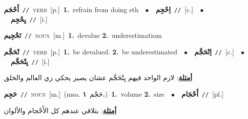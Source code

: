 \documentclass[10pt,a4paper,twoside]{article} %
\begin{document}
\begin{multicols}{2}
{\setlength\topsep{0pt}\textbf{\foreignlanguage{arabic}{أَحْجَم}}\ {\color{gray}\texttt{//}\color{black}}\ \textsc{verb}\ [p.]\ \textbf{1.}~refrain from doing sth\ \ $\bullet$\ \ \setlength\topsep{0pt}\textbf{\foreignlanguage{arabic}{اِحْجِم}}\ {\color{gray}\texttt{//}\color{black}}\ [c.]\ \ $\bullet$\ \ \setlength\topsep{0pt}\textbf{\foreignlanguage{arabic}{يِحْجِم}}\ {\color{gray}\texttt{//}\color{black}}\ [i.]\ } \vspace{2mm}

{\setlength\topsep{0pt}\textbf{\foreignlanguage{arabic}{تَحْجِيم}}\ {\color{gray}\texttt{//}\color{black}}\ \textsc{noun}\ [m.]\ \textbf{1.}~devalue  \textbf{2.}~underestimatiom\ } \vspace{2mm}

{\setlength\topsep{0pt}\textbf{\foreignlanguage{arabic}{تْحَجَّم}}\ {\color{gray}\texttt{//}\color{black}}\ \textsc{verb}\ [p.]\ \textbf{1.}~be devalued.  \textbf{2.}~be underestimated\ \ $\bullet$\ \ \setlength\topsep{0pt}\textbf{\foreignlanguage{arabic}{اِتْحَجَّم}}\ {\color{gray}\texttt{//}\color{black}}\ [c.]\ \ $\bullet$\ \ \setlength\topsep{0pt}\textbf{\foreignlanguage{arabic}{يِتْحَجَّم}}\ {\color{gray}\texttt{//}\color{black}}\ [i.]\  \begin{flushright}\color{gray}\foreignlanguage{arabic}{\textbf{\underline{\foreignlanguage{arabic}{أمثلة}}}: لازم الواحد فيهم يِتْحَجَّم عشان يصير يحكي زي العالم والخلق}\end{flushright}\color{black}} \vspace{2mm}

{\setlength\topsep{0pt}\textbf{\foreignlanguage{arabic}{حَجِم}}\ {\color{gray}\texttt{//}\color{black}}\ \textsc{noun}\ [m.]\ \color{gray}(msa. \foreignlanguage{arabic}{حَجْم}~\foreignlanguage{arabic}{\textbf{١.}})\color{black}\ \textbf{1.}~volume  \textbf{2.}~size\ \ $\bullet$\ \ \setlength\topsep{0pt}\textbf{\foreignlanguage{arabic}{أَحْجَام}}\ {\color{gray}\texttt{//}\color{black}}\ [pl.]\  \begin{flushright}\color{gray}\foreignlanguage{arabic}{\textbf{\underline{\foreignlanguage{arabic}{أمثلة}}}: بتلاقي عندهم كل الأَحْجام والألوان}\end{flushright}\color{black}} \vspace{2mm}


\end{multicols}
\end{document}
